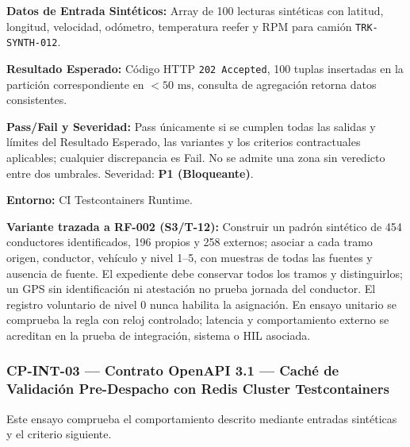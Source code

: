 \par\noindent\textbf{Datos de Entrada Sintéticos:} Array de 100 lecturas sintéticas con latitud, longitud, velocidad, odómetro, temperatura reefer y RPM para camión \texttt{T\allowbreak{}R\allowbreak{}K\allowbreak{}-\allowbreak{}S\allowbreak{}Y\allowbreak{}N\allowbreak{}T\allowbreak{}H\allowbreak{}-\allowbreak{}0\allowbreak{}1\allowbreak{}2\allowbreak{}}.\par
\par\noindent\textbf{Resultado Esperado:} Código HTTP \texttt{2\allowbreak{}0\allowbreak{}2\allowbreak{} A\allowbreak{}c\allowbreak{}c\allowbreak{}e\allowbreak{}p\allowbreak{}t\allowbreak{}e\allowbreak{}d\allowbreak{}}, 100 tuplas insertadas en la partición correspondiente en \(< 50\text{ ms}\), consulta de agregación retorna datos consistentes.\par
\par\noindent\textbf{Pass/Fail y Severidad:} Pass únicamente si se cumplen todas las salidas y límites del Resultado Esperado, las variantes y los criterios contractuales aplicables; cualquier discrepancia es Fail. No se admite una zona sin veredicto entre dos umbrales. Severidad: \textbf{P1 (Bloqueante)}.\par
\par\noindent\textbf{Entorno:} CI Testcontainers Runtime.\par







\par\noindent\textbf{Variante trazada a RF-002 (S3/T-12):} Construir un padrón sintético de 454 conductores identificados, 196 propios y 258 externos; asociar a cada tramo origen, conductor, vehículo y nivel 1–5, con muestras de todas las fuentes y ausencia de fuente. El expediente debe conservar todos los tramos y distinguirlos; un GPS sin identificación ni atestación no prueba jornada del conductor. El registro voluntario de nivel 0 nunca habilita la asignación. En ensayo unitario se comprueba la regla con reloj controlado; latencia y comportamiento externo se acreditan en la prueba de integración, sistema o HIL asociada.\par
\subsubsection*{CP-INT-03 — Contrato OpenAPI 3.1 — Caché de Validación Pre-Despacho con Redis Cluster Testcontainers}\label{sec:9-cp-int-03}
Este ensayo comprueba el comportamiento descrito mediante entradas sintéticas y el criterio siguiente.

